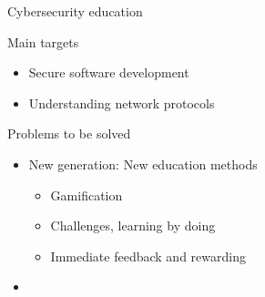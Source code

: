 \documentclass[12 pt]{beamer}
\newcommand{\tanedo}{tanedolight}		%
\newcommand{\Comment}[1]{\textcolor{Comment}{\footnotesize{#1}\normalsize}} %
\begin{document}
{\begin{frame}[c]
\begin{center}
\end{center}
\end{frame}
}



\begin{frame}{Cybersecurity education}

  \begin{block}{Main targets}
    \begin{itemize}
        \item{Secure software development}
        \item{Understanding network protocols}
    \end{itemize}
  \end{block}

  \begin{block}{Problems to be solved}
    \begin{itemize}
        \item{New generation: New education methods}
          \begin{itemize}
            \item{Gamification}
            \item{Challenges, learning by doing}
            \item{Immediate feedback and rewarding}
          \end{itemize}
        \item{}
    \end{itemize}
  \end{block}

\end{frame}

\end{document}
